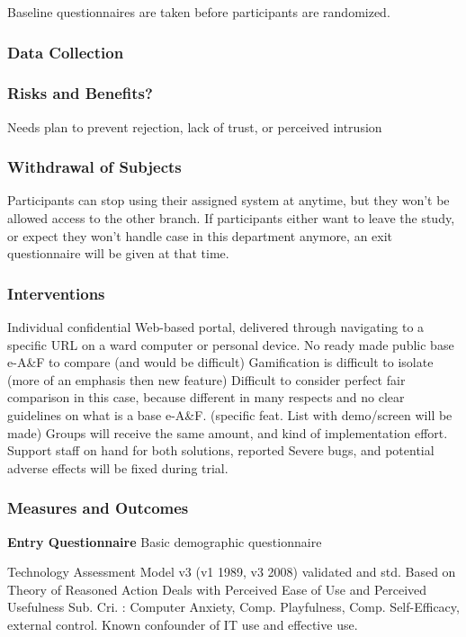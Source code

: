 Baseline questionnaires are taken before participants are randomized.


\subsubsection{Data Collection}
\lipsum[2]

\subsubsection{Risks and Benefits?}
Needs plan to prevent rejection, lack of trust, or perceived intrusion

\lipsum[1]

\subsubsection{Withdrawal of Subjects}

Participants can stop using their assigned system at anytime, but they won't be allowed access to the other branch. If participants either want to leave the study, or expect they won't handle case in this department anymore, an exit questionnaire will be given at that time.


\lipsum[1]

\subsubsection{Interventions}
Individual confidential Web-based portal, delivered through navigating to a specific URL on a ward computer or personal device.
No ready made public base e-A\&F to compare (and would be difficult)
Gamification is difficult to isolate (more of an emphasis then new feature)
Difficult to consider perfect fair comparison in this case, because different in many respects and no clear guidelines on what is a base e-A\&F. (specific feat. List with demo/screen will be made)
Groups will receive the same amount, and kind of implementation effort.
Support staff on hand for both solutions,  reported Severe bugs, and potential adverse effects will be fixed during trial.

\subsubsection{Measures and Outcomes}

\textbf{Entry Questionnaire}
Basic demographic questionnaire

Technology Assessment Model v3 (v1 1989, v3 2008) validated and std.
Based on Theory of Reasoned Action
Deals with Perceived Ease of Use and Perceived Usefulness
Sub. Cri. : Computer Anxiety, Comp. Playfulness, Comp. Self-Efficacy, external control.
Known confounder of IT use and effective use.


